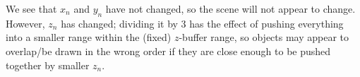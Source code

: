 \documentclass[11pt]{tingpset}
\begin{document}

    We see that $x_n$ and $y_n$ have not changed, so the scene will not appear to change. However, $z_n$ has changed; dividing it by 3 has the effect of pushing everything into a smaller range within the (fixed) $z$-buffer range, so objects may appear to overlap/be drawn in the wrong order if they are close enough to be pushed together by smaller $z_n$.
\end{document}

